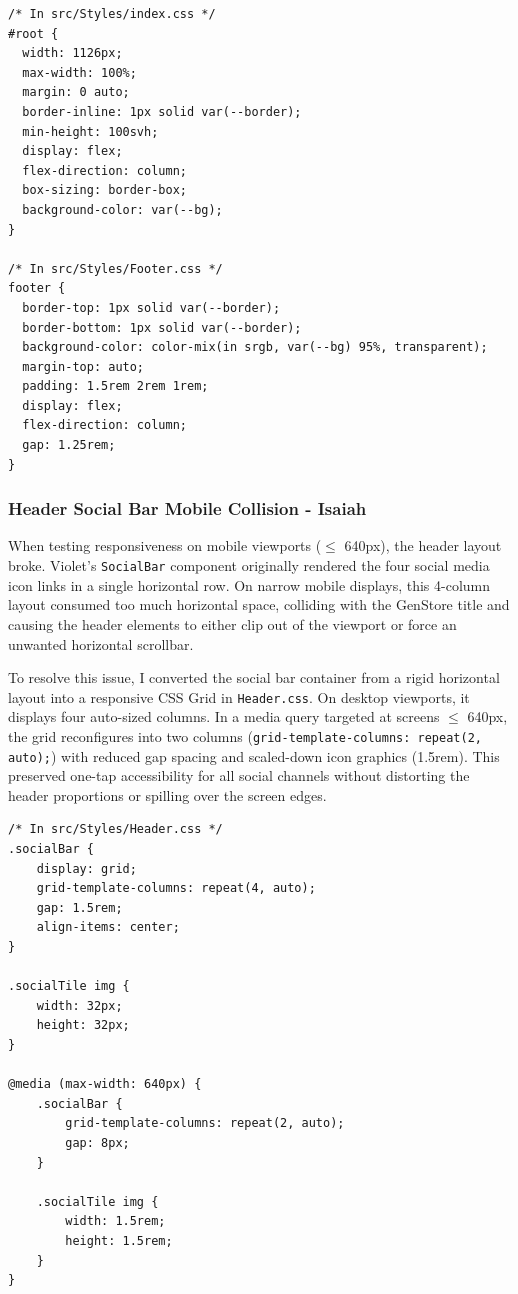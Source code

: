\documentclass{article}[12pt]
\begin{document}
\begin{lstlisting}[caption=Sticky Footer Flexbox Implementation]
/* In src/Styles/index.css */
#root {
  width: 1126px;
  max-width: 100%;
  margin: 0 auto;
  border-inline: 1px solid var(--border);
  min-height: 100svh;
  display: flex;
  flex-direction: column;
  box-sizing: border-box;
  background-color: var(--bg);
}

/* In src/Styles/Footer.css */
footer {
  border-top: 1px solid var(--border);
  border-bottom: 1px solid var(--border);
  background-color: color-mix(in srgb, var(--bg) 95%, transparent);
  margin-top: auto;
  padding: 1.5rem 2rem 1rem;
  display: flex;
  flex-direction: column;
  gap: 1.25rem;
}
\end{lstlisting}

\subsubsection{Header Social Bar Mobile Collision - Isaiah}
When testing responsiveness on mobile viewports ($\le$ 640px), the header layout broke. Violet's \texttt{SocialBar} component originally rendered the four social media icon links in a single horizontal row. On narrow mobile displays, this 4-column layout consumed too much horizontal space, colliding with the GenStore title and causing the header elements to either clip out of the viewport or force an unwanted horizontal scrollbar.

To resolve this issue, I converted the social bar container from a rigid horizontal layout into a responsive CSS Grid in \texttt{Header.css}. On desktop viewports, it displays four auto-sized columns. In a media query targeted at screens $\le$ 640px, the grid reconfigures into two columns (\texttt{grid-template-columns: repeat(2, auto);}) with reduced gap spacing and scaled-down icon graphics (1.5rem). This preserved one-tap accessibility for all social channels without distorting the header proportions or spilling over the screen edges.

\begin{lstlisting}[caption=Responsive Social Bar CSS Grid]
/* In src/Styles/Header.css */
.socialBar {
    display: grid;
    grid-template-columns: repeat(4, auto);
    gap: 1.5rem;
    align-items: center;
}

.socialTile img {
    width: 32px;
    height: 32px;
}

@media (max-width: 640px) {
    .socialBar {
        grid-template-columns: repeat(2, auto);
        gap: 8px;
    }

    .socialTile img {
        width: 1.5rem;
        height: 1.5rem;
    }
}
\end{lstlisting}
\end{document}
